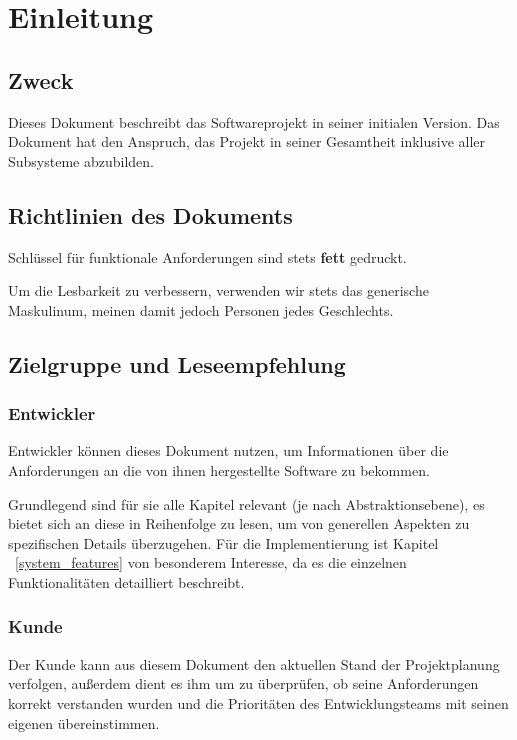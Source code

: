 \section{Einleitung}
\subsection{Zweck}
Dieses Dokument beschreibt das Softwareprojekt  in seiner initialen Version.
Das Dokument hat den Anspruch, das Projekt in seiner Gesamtheit inklusive aller Subsysteme abzubilden.

\subsection{Richtlinien des Dokuments}

Schlüssel für funktionale Anforderungen sind stets \textbf{fett} gedruckt.

Um die Lesbarkeit zu verbessern, verwenden wir stets das generische Maskulinum, meinen damit jedoch Personen
jedes Geschlechts.

\subsection{Zielgruppe und Leseempfehlung}
\subsubsection{Entwickler}

Entwickler können dieses Dokument nutzen, um Informationen über die Anforderungen an die von ihnen hergestellte
Software zu bekommen.

Grundlegend sind für sie alle Kapitel relevant (je nach Abstraktionsebene),
es bietet sich an diese in Reihenfolge zu lesen, um von generellen Aspekten zu spezifischen Details überzugehen.
Für die Implementierung ist Kapitel ~\ref{system_features} von besonderem Interesse,
da es die einzelnen Funktionalitäten detailliert beschreibt.

\subsubsection{Kunde}
Der Kunde kann aus diesem Dokument den aktuellen Stand der Projektplanung verfolgen, 
außerdem dient es ihm um zu überprüfen, ob seine Anforderungen korrekt verstanden wurden
und die Prioritäten des Entwicklungsteams mit seinen eigenen übereinstimmen.

